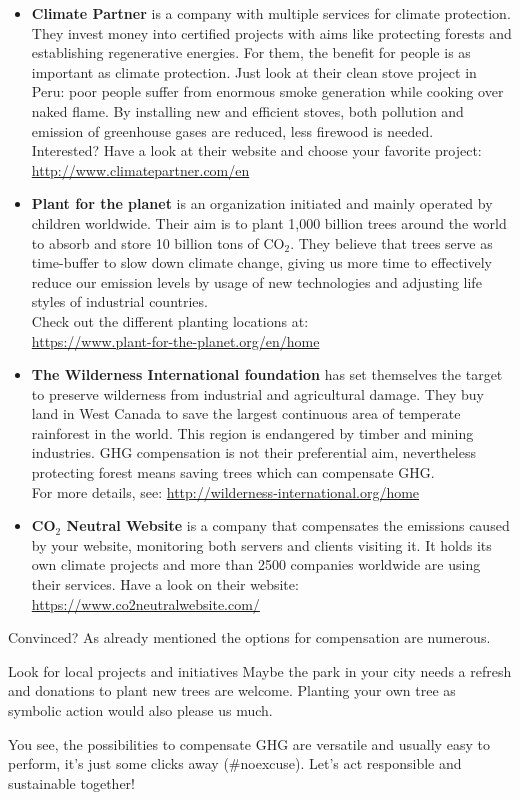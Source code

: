 \begin{itemize}
	\item 
	\textbf{Climate Partner} is a company with multiple services for climate protection.  They invest money into certified projects with aims like protecting forests and establishing regenerative energies. For them, the benefit for people is as important as climate protection. Just look at their clean stove project in Peru: poor people suffer from enormous smoke generation while cooking over naked flame. By installing new and efficient stoves, both pollution and emission of greenhouse gases are reduced, less firewood is needed. \\
	Interested? Have a look at their website and choose your favorite project: \\ \url{http://www.climatepartner.com/en} 

	\item 
	\textbf{Plant for the planet} is an organization initiated and mainly operated by children worldwide. Their aim is to plant 1,000 billion trees around the world to absorb and store 10 billion tons of CO$_2$. They believe that trees serve as time-buffer to slow down climate change, giving us more time to effectively reduce our emission levels by usage of new technologies and adjusting life styles of industrial countries. \\
	Check out the different planting locations at: \\
	\url{https://www.plant-for-the-planet.org/en/home} 

	\item 
	\textbf{The Wilderness International foundation} has set themselves the target to preserve wilderness from industrial and agricultural damage. They buy land in West Canada to save the largest continuous area of temperate rainforest in the world. This region is endangered by timber and mining industries. GHG compensation is not their preferential aim, nevertheless protecting forest means saving trees which can compensate GHG. \\
	For more details, see: \url{http://wilderness-international.org/home}
	
	\item
	\textbf{CO$_2$ Neutral Website} is a company that compensates the emissions caused by your website, monitoring both servers and clients visiting it. It holds its own climate projects and more than 2500 companies worldwide are using their services.
	Have a look on their website: \url{https://www.co2neutralwebsite.com/}
\end{itemize}

Convinced? As already mentioned the options for compensation are numerous.

\begin{suggest}{Look for local projects and initiatives} 
	Maybe the park in your city needs a refresh and donations to plant new trees are welcome. Planting your own tree as symbolic action would also please us much.	
\end{suggest}


You see, the possibilities to compensate GHG are versatile and usually easy to perform, it's just some clicks away (\#noexcuse). Let's act responsible and sustainable together!


